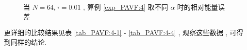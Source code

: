 \begin{figure}[H]
\begin{center}
  
\caption{当  $N = 64 , \tau=0.01$ , 算例 \ref{exp_PAVF:4} 取不同 $\alpha$ 时的相对能量误差}
\label{fig_PAVF:12}
\end{center}
\end{figure}

更详细的比较结果见表 \ref{tab_PAVF:4-1} - \ref{tab_PAVF:4-4} , 观察这些数据 , 可得到同样的结论.

